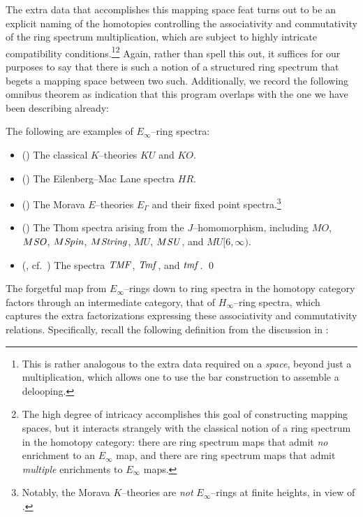 The extra data that accomplishes this mapping space feat turns out to be an explicit naming of the homotopies controlling the associativity and commutativity of the ring spectrum multiplication, which are subject to highly intricate compatibility conditions.\footnote{This is rather analogous to the extra data required on a \emph{space}, beyond just a multiplication, which allows one to use the bar construction to assemble a delooping.}\footnote{The high degree of intricacy accomplishes this goal of constructing mapping spaces, but it interacts strangely with the classical notion of a ring spectrum in the homotopy category: there are ring spectrum maps that admit \emph{no} enrichment to an $E_\infty$ map, and there are ring spectrum maps that admit \emph{multiple} enrichments to $E_\infty$ maps.}  Again, rather than spell this out, it suffices for our purposes to say that there is such a notion of a structured ring spectrum that begets a mapping space between two such.  Additionally, we record the following omnibus theorem as indication that this program overlaps with the one we have been describing already:
\begin{theorem}
The following are examples of $E_\infty$--ring spectra:
\begin{itemize}
    \item (\cite[Section VIII.1]{MayRingSpacesSpectra}) The classical $K$--theories $KU$ and $KO$.
    \item (\cite[Section VIII.1]{MayRingSpacesSpectra}) The Eilenberg--Mac Lane spectra $HR$.
    \item (\cite[Corollary 7.6--7]{GoerssHopkins}) The Morava $E$--theories $E_\Gamma$ and their fixed point spectra.\footnote{Notably, the Morava $K$--theories are \emph{not} $E_\infty$--rings at finite heights, in view of .}
    \item (\cite[Section IV.3]{MayRingSpacesSpectra}) The Thom spectra arising from the $J$--homomorphism, including $MO$, $M\mathit{SO}$, $M\mathit{Spin}$, $M\mathit{String}$, $MU$, $M\mathit{SU}$, and $MU[6, \infty)$.
    \item (\cite{BehrensConstruction}, cf.\ ) The spectra $\mathit{TMF}$, $\mathit{Tmf}$, and $\mathit{tmf}$. \qed
\end{itemize}
\end{theorem}

The forgetful map from $E_\infty$--rings down to ring spectra in the homotopy category factors through an intermediate category, that of $H_\infty$--ring spectra, which captures the extra factorizations expressing these associativity and commutativity relations.  Specifically, recall the following definition from the discussion in :

